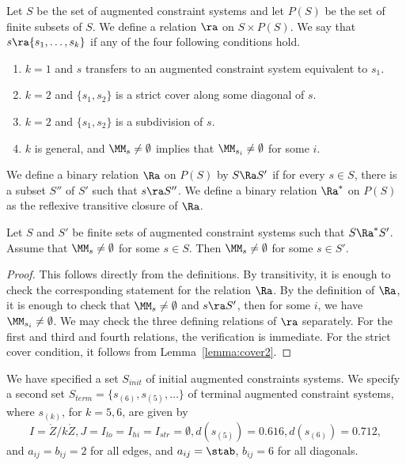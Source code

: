 \begin{definition}[$\ra$~$\Ra$~$\Ra^*$]  
Let $S$ be the set of augmented constraint systems
and let $P(S)$ be the set of finite subsets of $S$.  We define a relation $\ra$ on $S\times P(S)$.
We say that $s\ra \{s_1,\ldots,s_k\}$ if any of the four following conditions hold.
\begin{enumerate}
\item $k=1$ and $s$ transfers to an augmented constraint system equivalent to $s_1$.
\item $k=2$ and $\{s_1,s_2\}$ is a strict cover along some diagonal of $s$.
\item $k=2$ and $\{s_1,s_2\}$ is a subdivision of $s$.
\item $k$ is general, and $\MM_s\ne\emptyset$ implies that 
$\MM_{s_i}\ne\emptyset$ for some $i$.
\end{enumerate}
We define a binary relation $\Ra$ on $P(S)$ by
$S\Ra S'$ if for every $s\in S$, there is a subset $S''$ of $S'$ such that
$s\ra S''$.  We define a binary relation $\Ra^*$ on $P(S)$ as the reflexive
transitive closure of $\Ra$.
\end{definition}

\begin{lemma}\label{lemma:propagate}
Let $S$  and $S'$ be finite sets of augmented constraint systems such that
$S\Ra^* S'$.  Assume that $\MM_s\ne\emptyset$ for some $s\in S$.
Then $\MM_s\ne\emptyset$ for some $s\in S'$.
\end{lemma}

\begin{proof} This follows directly from the definitions.  By transitivity,
it is enough to check the corresponding statement for the relation $\Ra$.
By the definition of $\Ra$, it is enough to check that $\MM_s\ne\emptyset$
and $s\ra S'$, then for some $i$, we have $\MM_{s_i}\ne\emptyset$.  We
may check the three defining relations of $\ra$ separately.  For the first
and third and fourth relations, the verification is immediate.  For the strict cover
condition, it follows from Lemma~\ref{lemma:cover2}.
\end{proof}

We have specified a set $S_{init}$ of initial augmented constraints systems.
We specify a second set $S_{term}=\{s_{(6)},s_{(5)},\ldots\}$ 
of terminal augmented constraint systems, where
 $s_{(k)}$, for $k=5,6$,  are given by
\[
I=\ring{Z}/k\ring{Z}, J=I_{lo}=I_{hi}=I_{str}=\emptyset, d(s_{(5)})=0.616, d(s_{(6)})=0.712,
\]
and $a_{ij}=b_{ij}=2$ for all edges, 
and $a_{ij}=\stab$, $b_{ij}=6$ for all diagonals.

